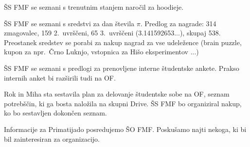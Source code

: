 \documentclass{seja}
\begin{document}
\begin{ad}
    \item
    ŠS FMF se seznani s trenutnim stanjem naročil za hoodieje.

    \item
    ŠS FMF se seznani s sredstvi za dan števila $\pi$. Predlog za nagrade: 314 zmagovalec, 159 2.~uvrščeni, 65 3.~uvrščeni (3.141592653...), skupaj 538. Preostanek sredstev se porabi za nakup nagrad za vse udeležence (brain puzzle, kupon za npr.~Črno Luknjo, vstopnica za Hišo eksperimentov ...)

    \item
    ŠS FMF se seznani s predlogi za prenovljene interne študentske ankete. Prakso internih anket bi razširili tudi na OF.

    \item
    Rok in Miha sta sestavila plan za delovanje študentske sobe na OF, seznam potrebščin, ki ga bosta naložila na skupni Drive. ŠS FMF bo organiziral nakup, ko bo sestavljen dokončen seznam.

    Informacije za Primatijado posredujemo ŠO FMF. Poskušamo najti nekoga, ki bi bil zainteresiran za organizacijo.
\end{ad}
\end{document}
